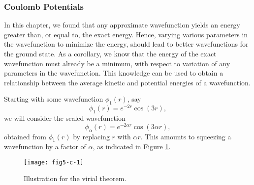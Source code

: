 \subsubsection{Coulomb Potentials}

In this chapter, we found that any approximate wavefunction yields an 
energy greater than, or equal to, the exact energy.  Hence, varying 
various parameters in the wavefunction to minimize the energy, should 
lead to better wavefunctions for the ground state.  As a corollary, we 
know that the energy of the exact wavefunction must already be a 
minimum, with respect to variation of any parameters in the 
wavefunction.  This knowledge can be used to obtain a relationship 
between the average kinetic and potential energies of a wavefunction.

Starting with some wavefunction $\phi_1(r)$, say
\begin{equation}
\phi_1 (r) = e^{-2r} \cos (3r) ,
\end{equation}
we will consider the scaled wavefunction
\begin{equation}
\phi_{\alpha} (r) = e^{-2 \alpha r} \cos \left( 3 \alpha r \right) ,
\end{equation}
obtained from $\phi_1(r)$ by replacing $r$ with $\alpha r$. This 
amounts to squeezing a wavefunction by a factor of $\alpha$, as 
indicated in Figure \ref{fig5-x-4}.  

\begin{figure}
\texttt{[image: fig5-c-1]}
\caption{Illustration for the virial theorem.}
\label{fig5-x-4}
\end{figure}

